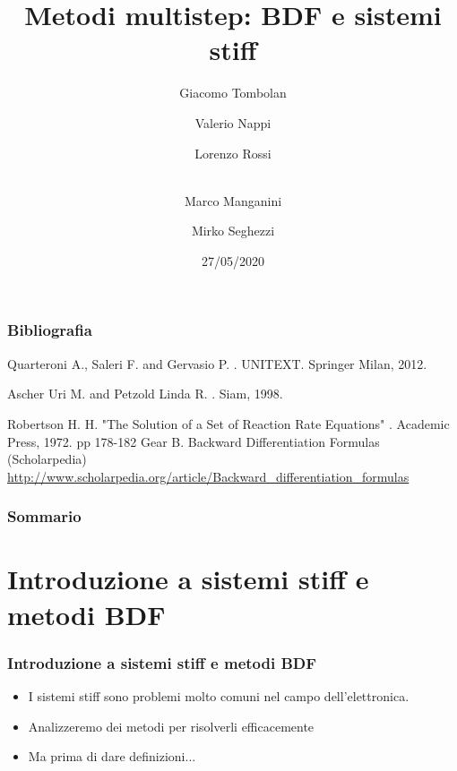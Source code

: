 \documentclass[aspectratio=169, 10pt, handout,usenames,dvipsnames]{beamer}
\title{Metodi multistep: BDF e sistemi stiff}
\date{27/05/2020}
\author{Giacomo Tombolan \and Valerio Nappi \and 
      Lorenzo Rossi \and  \texorpdfstring{\\ }  MMarco Manganini \and
      Mirko Seghezzi}
\begin{document}
\begin{frame}
  \maketitle
\end{frame}


\begin{frame}


  \frametitle{Bibliografia}
  \begin{thebibliography}{99}\small
    
    Quarteroni A., Saleri F. and Gervasio P.
    .
    \newblock UNITEXT. Springer Milan, 2012.

    Ascher Uri M. and Petzold Linda R.
    .
    \newblock Siam, 1998.

    Robertson H. H. "The Solution of a Set of Reaction Rate Equations"
    .
    \newblock Academic Press, 1972. pp 178-182
    Gear B.
    \newblock Backward Differentiation Formulas (Scholarpedia)
    \newblock \url{http://www.scholarpedia.org/article/Backward_differentiation_formulas}
  

   \end{thebibliography}

  
\end{frame}  




\begin{frame}
  \frametitle{Sommario}
  \tableofcontents
\end{frame}


\section{Introduzione a sistemi stiff e metodi BDF}\label{sec:sec1}
\begin{frame} \frametitle{Introduzione a sistemi stiff e metodi BDF}
    \begin{itemize}
        \item I sistemi stiff sono problemi molto comuni nel campo dell'elettronica. 
        \item Analizzeremo dei metodi per risolverli efficacemente
        \item Ma prima di dare definizioni...
    \end{itemize}
\end{frame}
\end{document}

